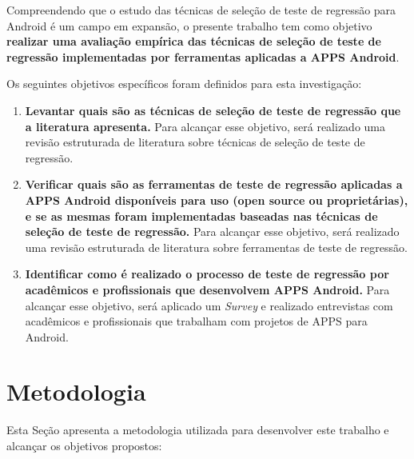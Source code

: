 Compreendendo que o estudo das técnicas de seleção de teste de regressão para Android é um campo em expansão, o presente trabalho tem como objetivo \textbf{realizar uma avaliação empírica das técnicas de seleção de teste de regressão implementadas por ferramentas aplicadas a \ac{APPS} Android}.

Os seguintes objetivos específicos foram definidos para esta investigação:

\begin{enumerate}[label=\bf O\arabic*,leftmargin=1.5cm]

    \item \textbf{Levantar quais são as técnicas de seleção de teste de regressão que a literatura apresenta.} Para alcançar esse objetivo, será realizado uma revisão estruturada de literatura sobre técnicas de seleção de teste de regressão.
    
    \item \textbf{Verificar quais são as ferramentas de teste de regressão aplicadas a \ac{APPS} Android disponíveis para uso (open source ou proprietárias), e se as mesmas foram implementadas baseadas nas técnicas de seleção de teste de regressão.} Para alcançar esse objetivo, será realizado uma revisão estruturada de literatura sobre ferramentas de teste de regressão.
    
    \item \textbf{Identificar como é realizado o processo de teste de regressão por acadêmicos e profissionais que desenvolvem \ac{APPS} Android.} Para alcançar esse objetivo, será aplicado um \textit{Survey} e realizado entrevistas com acadêmicos e profissionais que trabalham com projetos de \ac{APPS} para Android.


\end{enumerate}



\section{Metodologia}\label{sec:metodologia}


Esta Seção apresenta a metodologia utilizada para desenvolver este trabalho e alcançar os objetivos propostos:


